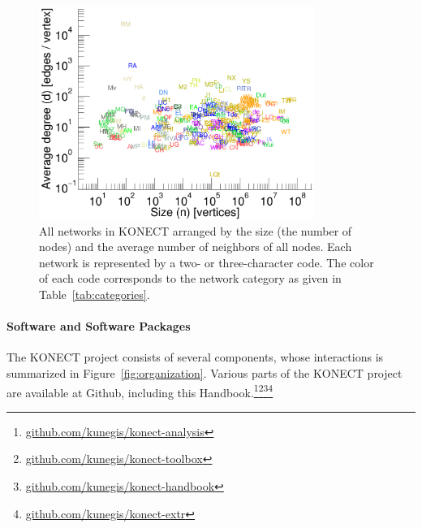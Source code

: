 \documentclass{article}
\begin{document}
\begin{figure}
  \centering
  \includegraphics[width=0.8\textwidth]{plot/scatter.c.size.avgdegree.everything}
  \caption[*]{
    All networks in KONECT
    arranged by the size (the number of nodes) and the
    average number of neighbors of all nodes.  Each network is
    represented by a two- or three-character code. The color of each
    code corresponds to the network 
    category as given in Table~\ref{tab:categories}.  
  }
  \label{fig:scatter.size.avgdegree}
\end{figure}

\paragraph{Software and Software Packages}
The KONECT project consists of several components, whose interactions is
summarized in Figure~\ref{fig:organization}.  Various parts of the
KONECT project are available at Github, including this Handbook.\footnote{\href{https://github.com/kunegis/konect-analysis}{github.com/kunegis/konect-analysis}}\footnote{\href{https://github.com/kunegis/konect-toolbox}{github.com/kunegis/konect-toolbox}}\footnote{\href{https://github.com/kunegis/konect-handbook}{github.com/kunegis/konect-handbook}}\footnote{\href{https://github.com/kunegis/konect-extr}{github.com/kunegis/konect-extr}}
\end{document}
